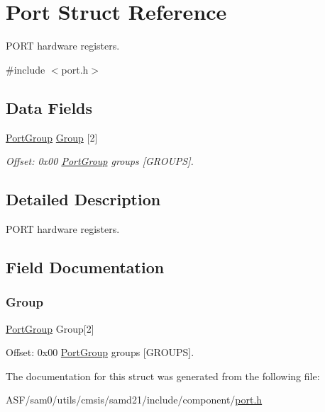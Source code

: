 \hypertarget{struct_port}{}\section{Port Struct Reference}
\label{struct_port}


P\+O\+RT hardware registers.  




{\ttfamily \#include $<$port.\+h$>$}

\subsection*{Data Fields}
\begin{DoxyCompactItemize}
\item 
\mbox{\hyperlink{struct_port_group}{Port\+Group}} \mbox{\hyperlink{struct_port_a2835fbe01c690d47cdc62805282806c2}{Group}} \mbox{[}2\mbox{]}
\begin{DoxyCompactList}\small\item\em Offset\+: 0x00 \mbox{\hyperlink{struct_port_group}{Port\+Group}} groups \mbox{[}G\+R\+O\+U\+PS\mbox{]}. \end{DoxyCompactList}\end{DoxyCompactItemize}


\subsection{Detailed Description}
P\+O\+RT hardware registers. 

\subsection{Field Documentation}
\mbox{\label{struct_port_a2835fbe01c690d47cdc62805282806c2}} 
\subsubsection{\texorpdfstring{Group}{Group}}
{\footnotesize\ttfamily \mbox{\hyperlink{struct_port_group}{Port\+Group}} Group\mbox{[}2\mbox{]}}



Offset\+: 0x00 \mbox{\hyperlink{struct_port_group}{Port\+Group}} groups \mbox{[}G\+R\+O\+U\+PS\mbox{]}. 



The documentation for this struct was generated from the following file\+:\begin{DoxyCompactItemize}
\item 
A\+S\+F/sam0/utils/cmsis/samd21/include/component/\mbox{\hyperlink{utils_2cmsis_2samd21_2include_2component_2port_8h}{port.\+h}}\end{DoxyCompactItemize}
